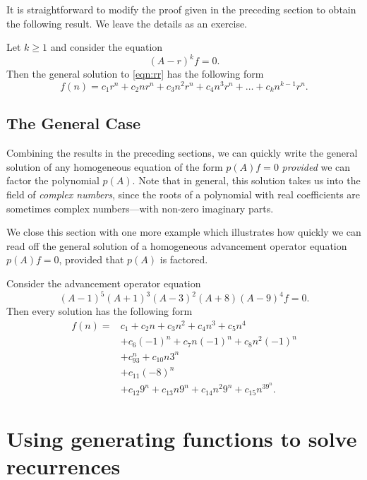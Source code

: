 It is straightforward to modify the proof given in the preceding
section to obtain the following result.  We leave the details as an
exercise.
\begin{lemma}\label{lem:rr}
  Let $k\ge1$ and consider the equation
  \begin{equation}\label{eqn:rr}
    (A-r)^kf=0.
  \end{equation}
  Then the general solution to \autoref{eqn:rr} has the following form
  \begin{equation}\label{eqn:solutionrr}
    f(n)=c_1r^n+c_2nr^n+c_3n^2r^n+c_4n^3r^n+\dots+c_kn^{k-1}r^n.
  \end{equation}
\end{lemma}

\subsection{The General Case}\label{s:recurrence:rigorous:general}

Combining the results in the preceding sections, we can quickly write
the general solution of any homogeneous equation of the form $p(A)f=0$
\textit{provided} we can factor the polynomial $p(A)$.  Note that in
general, this solution takes us into the field of \textit{complex
  numbers}, since the roots of a polynomial with real coefficients are
sometimes complex numbers---with non-zero imaginary parts.

We close this section with one more example which illustrates how
quickly we can read off the general solution of a homogeneous
advancement operator equation $p(A)f=0$, provided that $p(A)$ is
factored.

\begin{example}
Consider the advancement operator equation
\[
(A-1)^5(A+1)^3(A-3)^2(A+8)(A-9)^4f=0.
\]
Then every solution has the following form
\begin{align*}
f(n)=&c_1+c_2n+c_3n^2+c_4n^3+c_5n^4\\
     &+c_6(-1)^n+c_7n(-1)^n+c_8n^2(-1)^n\\
     &+c_93^n+c_{10}n3^n\\
     &+c_{11}(-8)^n\\
     &+c_{12}9^n +c_{13}n 9^n+c_{14}n^2 9^n +c_{15}n^39^n.
\end{align*}

\end{example}

\section{Using generating functions to solve recurrences}\label{s:recurrence:genfunction}

